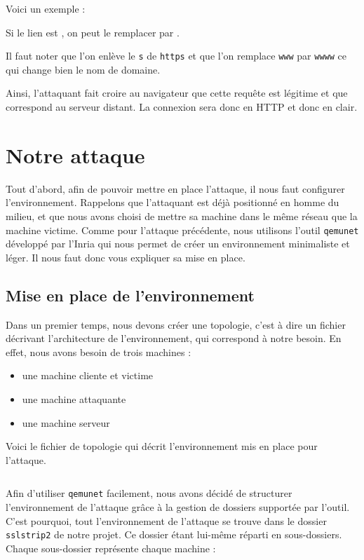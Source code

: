 Voici un exemple :

Si le lien est , on peut le remplacer par .

Il faut noter que l'on enlève le \verb+s+ de \verb+https+ et que l'on remplace \verb+www+ par \verb+wwww+ ce qui change bien le nom de domaine.

Ainsi, l'attaquant fait croire au navigateur que cette requête est légitime et que  correspond au serveur distant. La connexion sera donc en HTTP et donc en clair.

\section{Notre attaque}

Tout d'abord, afin de pouvoir mettre en place l'attaque, il nous faut configurer l'environnement. Rappelons que l'attaquant est déjà positionné en homme du milieu, et que nous avons choisi de mettre sa machine dans le même réseau que la machine victime. Comme pour l'attaque précédente, nous utilisons l'outil \verb+qemunet+ développé par l'Inria qui nous permet de créer un environnement minimaliste et léger. Il nous faut donc vous expliquer sa mise en place.

\subsection{Mise en place de l'environnement}

Dans un premier temps, nous devons créer une topologie, c'est à dire un fichier décrivant l'architecture de l'environnement, qui correspond à notre besoin. En effet, nous avons besoin de trois machines :

\begin{itemize}
\item une machine cliente et victime
\item une machine attaquante
\item une machine serveur
\end{itemize}

Voici le fichier de topologie qui décrit l'environnement mis en place pour l'attaque.

\inputminted[bgcolor=lbcolor, breaklines]{shell}{../sslstrip2/topology}

Afin d'utiliser \verb+qemunet+ facilement, nous avons décidé de structurer l'environnement de l'attaque grâce à la gestion de dossiers supportée par l'outil. C'est pourquoi, tout l'environnement de l'attaque se trouve dans le dossier \verb+sslstrip2+ de notre projet. Ce dossier étant lui-même réparti en sous-dossiers. Chaque sous-dossier représente chaque machine :

